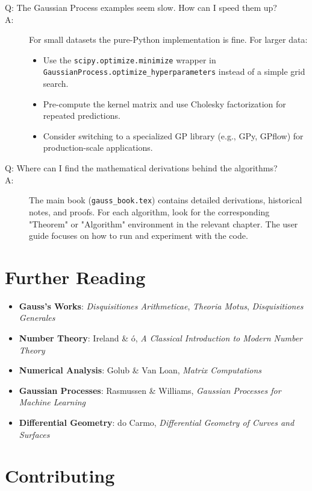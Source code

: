 \documentclass[11pt,a4paper]{article}
\begin{document}
\begin{description}
  \item[Q: The Gaussian Process examples seem slow. How can I speed them up?]
  \item[A:] For small datasets the pure-Python implementation is fine. For larger data:
  \begin{itemize}
    \item Use the {\tt scipy.optimize.minimize} wrapper in {\tt GaussianProcess.optimize\_hyperparameters} instead of a simple grid search.
    \item Pre-compute the kernel matrix and use Cholesky factorization for repeated predictions.
    \item Consider switching to a specialized GP library (e.g., GPy, GPflow) for production-scale applications.
  \end{itemize}
  \item[Q: Where can I find the mathematical derivations behind the algorithms?]
  \item[A:] The main book ({\tt gauss\_book.tex}) contains detailed derivations, historical notes, and proofs. For each algorithm, look for the corresponding "Theorem" or "Algorithm" environment in the relevant chapter. The user guide focuses on how to run and experiment with the code.
\end{description}

\section{Further Reading}

\begin{itemize}
    \item \textbf{Gauss's Works}: \textit{Disquisitiones Arithmeticae}, \textit{Theoria Motus}, \textit{Disquisitiones Generales}
    \item \textbf{Number Theory}: Ireland \& \'o, \textit{A Classical Introduction to Modern Number Theory}
    \item \textbf{Numerical Analysis}: Golub \& Van Loan, \textit{Matrix Computations}
    \item \textbf{Gaussian Processes}: Rasmussen \& Williams, \textit{Gaussian Processes for Machine Learning}
    \item \textbf{Differential Geometry}: do Carmo, \textit{Differential Geometry of Curves and Surfaces}
\end{itemize}

\section{Contributing}
\end{document}
